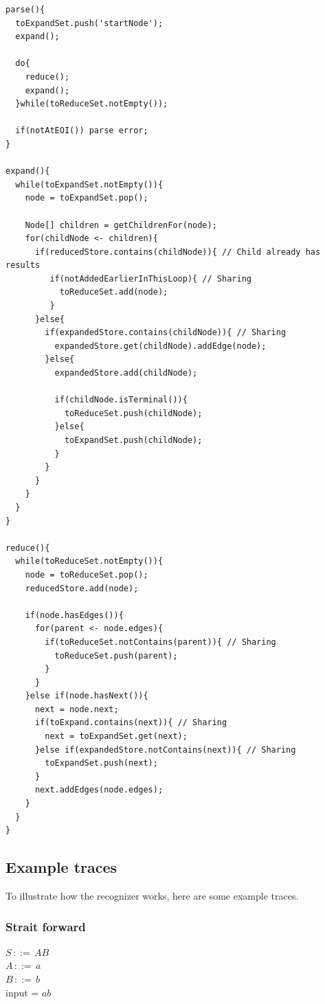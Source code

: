\documentclass[a4paper,10pt]{article}
\begin{document}
{\small
\begin{verbatim}
parse(){
  toExpandSet.push('startNode');
  expand();
  
  do{
    reduce();
    expand();
  }while(toReduceSet.notEmpty());
  
  if(notAtEOI()) parse error;
}

expand(){
  while(toExpandSet.notEmpty()){
    node = toExpandSet.pop();
    
    Node[] children = getChildrenFor(node);
    for(childNode <- children){
      if(reducedStore.contains(childNode)){ // Child already has results
         if(notAddedEarlierInThisLoop){ // Sharing
           toReduceSet.add(node);
         }
      }else{
        if(expandedStore.contains(childNode)){ // Sharing
          expandedStore.get(childNode).addEdge(node);
        }else{
          expandedStore.add(childNode);
          
          if(childNode.isTerminal()){
            toReduceSet.push(childNode);
          }else{
            toExpandSet.push(childNode);
          }
        }
      }
    }
  }
}

reduce(){
  while(toReduceSet.notEmpty()){
    node = toReduceSet.pop();
    reducedStore.add(node);
    
    if(node.hasEdges()){
      for(parent <- node.edges){
        if(toReduceSet.notContains(parent)){ // Sharing
          toReduceSet.push(parent);
        }
      }
    }else if(node.hasNext()){
      next = node.next;
      if(toExpand.contains(next)){ // Sharing
        next = toExpandSet.get(next);
      }else if(expandedStore.notContains(next)){ // Sharing
        toExpandSet.push(next);
      }
      next.addEdges(node.edges);
    }
  }
}
\end{verbatim}
}

\subsection{Example traces}

To illustrate how the recognizer works, here are some example traces.

\subsubsection{Strait forward}
$S\,::=\,AB$\\
$A\,::=\,a$\\
$B\,::=\,b$\\
input = $ab$
\end{document}
